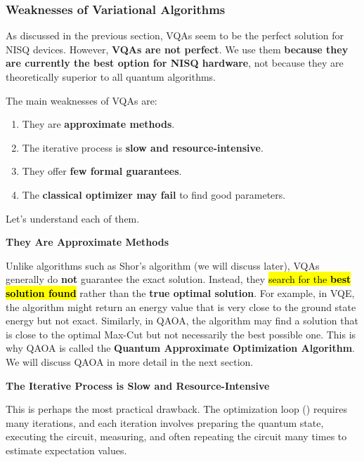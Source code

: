 \subsubsection{Weaknesses of Variational Algorithms}\label{sec:weaknesses-of-variational-algorithms}

As discussed in the previous section, VQAs seem to be the perfect solution for NISQ devices. However, \textbf{VQAs are not perfect}. We use them \textbf{because they are currently the best option for NISQ hardware}, not because they are theoretically superior to all quantum algorithms.

\highspace
The main weaknesses of VQAs are:
\begin{enumerate}
    \item They are \textbf{approximate methods}.
    \item The iterative process is \textbf{slow and resource-intensive}.
    \item They offer \textbf{few formal guarantees}.
    \item The \textbf{classical optimizer may fail} to find good parameters.
\end{enumerate}
Let's understand each of them.

\highspace
\begin{flushleft}
    \textcolor{Red2}{ \textbf{They Are Approximate Methods}}
\end{flushleft}
Unlike algorithms such as Shor's algorithm (we will discuss later), VQAs generally do \textbf{not} guarantee the exact solution. Instead, they \hl{search for the \textbf{best solution found}} rather than the \textbf{true optimal solution}. For example, in VQE, the algorithm might return an energy value that is very close to the ground state energy but not exact. Similarly, in QAOA, the algorithm may find a solution that is close to the optimal Max-Cut but not necessarily the best possible one. This is why QAOA is called the \textbf{Quantum Approximate Optimization Algorithm}. We will discuss QAOA in more detail in the next section.

\highspace
\begin{flushleft}
    \textcolor{Red2}{ \textbf{The Iterative Process is Slow and Resource-Intensive}}
\end{flushleft}
This is perhaps the most practical drawback. The optimization loop () requires many iterations, and each iteration involves preparing the quantum state, executing the circuit, measuring, and often repeating the circuit many times to estimate expectation values.

